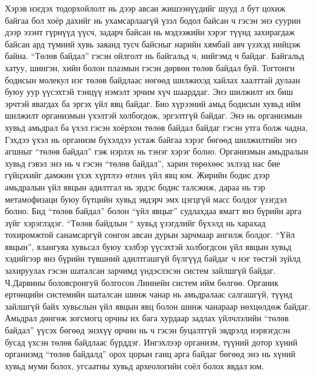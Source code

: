 Хэрэв нэгдэх тодорхойлолт нь дээр авсан жишээнүүдийг шууд л бут цохиж байгаа бол хоёр дахийг нь ухамсарлаагүй үзэл бодол байсан ч гэсэн энэ суурин дээр эзэнт гүрнүүд үүсч, задарч байсан нь мэдээжийн хэрэг түүнд захирагдаж байсан ард түмний хувь заяанд тусч байсныг нарийн хямбай авч үзэхэд нийцэж байна.
“Төлөв байдал” гэсэн ойлголт нь байгальд ч, нийгэмд ч байдаг. Байгальд хатуу, шингэн, хийн болон плазмын гэсэн дөрвөн төлөв байдал буй. Тогтонги бодисын молекул нэг төлөв байдлаас нөгөөд шилжихэд хайлах хаалттай дулаан буюу уур үүсэхтэй тэнцүү нэмэлт эрчим хүч шаарддаг. Энэ шилжилт их биш эрчтэй явагдах ба эргэх үйл явц байдаг. Био хүрээний амьд бодисын хувьд ийм шилжилт организмын үхэлтэй холбогдож, эргэлтгүй байдаг. Энэ нь организмын хувьд амьдрал ба үхэл гэсэн хоёрхон төлөв байдал байдаг гэсэн утга болж чадна, Гэхдээ үхэл нь организм бүхэлдээ устаж байгаа хэрэг бөгөөд шилжилтийн энэ агшныг “төлөв байдал” гэж нэрлэх нь тэнэг хэрэг болно. Организмын амьдралын хувьд гэвэл энэ нь ч гэсэн “төлөв байдал”, харин төрөхөөс эхлээд нас бие гүйцэхийг дамжин үхэх хүртлээ өтлөх үйл явц юм. Жирийн бодис дээр амьдралын үйл явцын адилтгал нь эрдэс бодис талсжиж, дараа нь тэр метамофизаци буюу бүтцийн хувьд эвдэрч эмх цэгцгүй масс болдог үзэгдэл болно.
Бид “төлөв байдал” болон “үйл явцыг” судлахдаа ямагт янз бүрийн арга зүйг хэрэглэдэг. “Төлөв байдлын “ хувьд үзэгдлийг бүхэлд нь харахад тохиромжтой санамсаргүй сонгон авсан дурын зарчмаар ангилж болдог. “Үйл явцын”, ялангуяа хувьсал буюу хэлбэр үүсэхтэй холбогдсон үйл явцын хувьд хэдийгээр янз бүрийн түвшний адилтгашгүй бүлгүүд байдаг ч нэг төстэй зүйлд захируулах гэсэн шаталсан зарчимд үндэслэсэн систем зайлшгүй байдаг. Ч.Дарвины боловсронгуй болгосон Линнейн систем ийм бөлгөө. Органик ертөнцийн системийн шаталсан шинж чанар нь амьдралаас салгашгүй, түүнд зайлшгүй байх хувьслын үйл явцын явц болон шинж чанараар нөхцөлдөж байдаг. Амьдрал дөнгөж зогсмогц орчны их бага хурдаар задлах үйлчлэлийн “төлөв байдал” үүсэх бөгөөд энэхүү орчин нь ч гэсэн буцалтгүй эвдрэлд нэрвэгдсэн бусад үхсэн төлөв байдлаас бүрддэг. Ингэхлээр организм, түүний дотор хүний организмд “төлөв байдалд” орох цорын ганц арга байдаг бөгөөд энэ нь хүний хувьд муми болох, угсаатны хувьд археологийн соёл болох явдал юм.
